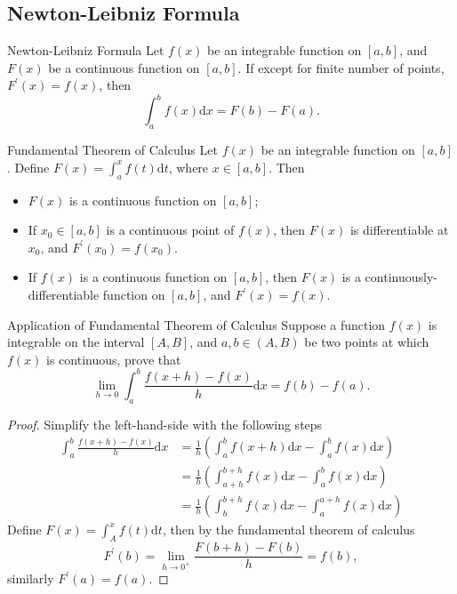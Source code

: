 \subsection{Newton-Leibniz Formula}

\begin{theorem}{Newton-Leibniz Formula}{}
  Let $f(x)$ be an integrable function on $[a, b]$,
  and $F(x)$ be a continuous function on $[a, b]$.
  If except for finite number of points,
  $F^{\prime}(x) = f(x)$, then
  \begin{equation}
    \int_a^b f(x) \mathrm{d} x = F(b) - F(a).
  \end{equation}
\end{theorem}

\begin{theorem}{Fundamental Theorem of Calculus}{}
  Let $f(x)$ be an integrable function on $[a, b]$.
  Define $F(x) = \int_a^x f(t)\mathrm{d} t$,
  where $x \in [a, b]$. Then
  \begin{itemize}
  \item $F(x)$ is a continuous function on $[a, b]$;
  \item If $x_0 \in [a, b]$ is a continuous point of $f(x)$,
    then $F(x)$ is differentiable at $x_0$,
    and $F^{\prime}(x_0) = f(x_0)$.
  \item If $f(x)$ is a continuous function on $[a, b]$,
    then $F(x)$ is a continuously-differentiable function on $[a, b]$,
    and $F^{\prime}(x) = f(x)$.
  \end{itemize}
\end{theorem}

\begin{example}{Application of Fundamental Theorem of Calculus}{}
  Suppose a function $f(x)$ is integrable on the interval $[A, B]$,
  and $a, b \in (A, B)$ be two points at which $f(x)$ is continuous, prove that
  \begin{equation}
    \lim \limits _{h \rightarrow 0} \int_a^b \frac{f(x+h) - f(x)}{h}\mathrm{d} x = f(b) - f(a).
  \end{equation}
\end{example}

\begin{proof}
  Simplify the left-hand-side with the following steps
  \begin{align}
    \int_a^b \frac{f(x+h) - f(x)}{h}\mathrm{d} x &= \frac{1}{h} \left( \int_a^b f(x+h)\mathrm{d} x - \int_a^b f(x)\mathrm{d}x \right)\\
    &= \frac{1}{h} \left( \int_{a+h}^{b+h} f(x)\mathrm{d} x - \int_a^b f(x)\mathrm{d} x \right)\\
    &= \frac{1}{h} \left( \int _b^{b+h} f(x)\mathrm{d} x - \int_a^{a+h} f(x)\mathrm{d} x \right)
  \end{align}
  Define $F(x) = \int_A^xf(t)\mathrm{d}t$,
  then by the fundamental theorem of calculus
  \begin{equation}
    F^{\prime}(b) = \lim \limits _{h \rightarrow 0^+} \frac{F(b + h) - F(b)}{h} = f(b),
  \end{equation}
  similarly $F^{\prime}(a) = f(a)$.
\end{proof}

